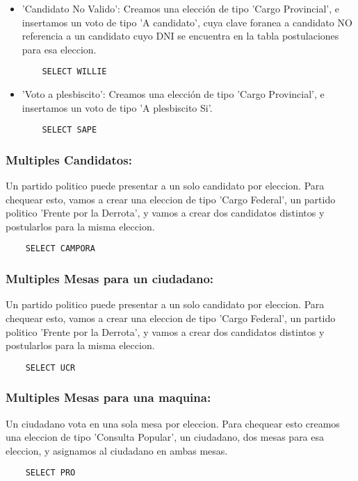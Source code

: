 \begin{enumerate}
\begin{itemize}
	\item 'Candidato No Valido': Creamos una elección de tipo 'Cargo Provincial', e insertamos un voto
	de tipo 'A candidato', cuya clave foranea a candidato NO referencia a un candidato cuyo DNI se encuentra en la tabla postulaciones para esa eleccion.
	\begin{lstlisting}
	SELECT WILLIE
	\end{lstlisting}
		
	\item 'Voto a plesbiscito': Creamos una elección de tipo 'Cargo Provincial', e insertamos un voto
	de tipo 'A plesbiscito Si'.
	\begin{lstlisting}
	SELECT SAPE
	\end{lstlisting}
			
	\end{itemize}

\subsubsection{Multiples Candidatos:} Un partido politico puede presentar a un solo candidato por eleccion. Para chequear esto, vamos a crear una eleccion de tipo 'Cargo Federal', un partido politico
'Frente por la Derrota', y vamos a crear dos candidatos distintos y postularlos para la misma eleccion.
	\begin{lstlisting}
	SELECT CAMPORA
	\end{lstlisting}
			

\subsubsection{Multiples Mesas para un ciudadano:} Un partido politico puede presentar a un solo candidato por eleccion. Para chequear esto, vamos a crear una eleccion de tipo 'Cargo Federal', un partido politico
'Frente por la Derrota', y vamos a crear dos candidatos distintos y postularlos para la misma eleccion.
	\begin{lstlisting}
	SELECT UCR
	\end{lstlisting}
			

\subsubsection{Multiples Mesas para una  maquina:} Un ciudadano vota en una sola mesa por eleccion. Para chequear esto creamos una eleccion de tipo 'Consulta Popular', un ciudadano, dos mesas para esa eleccion, y asignamos al ciudadano en ambas mesas.
	\begin{lstlisting}
	SELECT PRO
	\end{lstlisting}
								

\end{enumerate}

